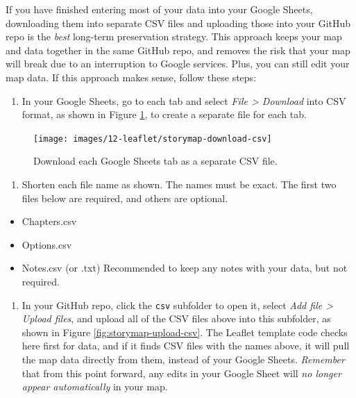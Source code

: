 \documentclass[
  english,
]{book}
\providecommand{\tightlist}{%
  \setlength{\itemsep}{0pt}\setlength{\parskip}{0pt}}
\begin{document}
If you have finished entering most of your data into your Google Sheets, downloading them into separate CSV files and uploading those into your GitHub repo is the \emph{best} long-term preservation strategy. This approach keeps your map and data together in the same GitHub repo, and removes the risk that your map will break due to an interruption to Google services. Plus, you can still edit your map data. If this approach makes sense, follow these steps:

\begin{enumerate}
\def\labelenumi{\arabic{enumi}.}
\tightlist
\item
  In your Google Sheets, go to each tab and select \emph{File \textgreater{} Download} into CSV format, as shown in Figure \ref{fig:storymap-download-csv}, to create a separate file for each tab.
\end{enumerate}



\begin{figure}
\texttt{[image: images/12-leaflet/storymap-download-csv]} \caption{Download each Google Sheets tab as a separate CSV file.}\label{fig:storymap-download-csv}
\end{figure}

\begin{enumerate}
\def\labelenumi{\arabic{enumi}.}
\setcounter{enumi}{1}
\tightlist
\item
  Shorten each file name as shown. The names must be exact. The first two files below are required, and others are optional.
\end{enumerate}

\begin{itemize}
\tightlist
\item
  Chapters.csv
\item
  Options.csv
\item
  Notes.csv (or .txt) Recommended to keep any notes with your data, but not required.
\end{itemize}

\begin{enumerate}
\def\labelenumi{\arabic{enumi}.}
\setcounter{enumi}{2}
\tightlist
\item
  In your GitHub repo, click the \texttt{csv} subfolder to open it, select \emph{Add file \textgreater{} Upload files}, and upload all of the CSV files above into this subfolder, as shown in Figure \ref{fig:storymap-upload-csv}. The Leaflet template code checks here first for data, and if it finds CSV files with the names above, it will pull the map data directly from them, instead of your Google Sheets. \emph{Remember} that from this point forward, any edits in your Google Sheet will \emph{no longer appear automatically} in your map.
\end{enumerate}
\end{document}
